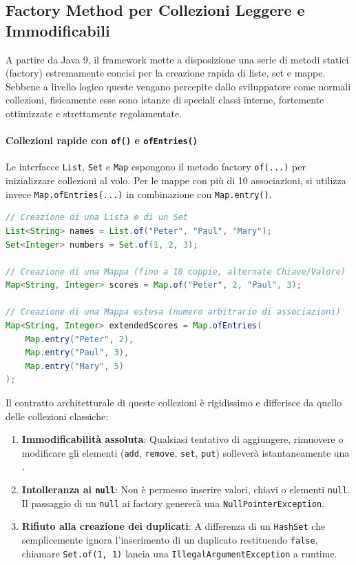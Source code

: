 \subsection{Factory Method per Collezioni Leggere e Immodificabili}

A partire da Java 9, il framework mette a disposizione una serie di metodi statici (factory) estremamente concisi per la creazione rapida di liste, set e mappe. Sebbene a livello logico queste vengano percepite dallo sviluppatore come normali collezioni, fisicamente esse sono istanze di speciali classi interne, fortemente ottimizzate e strettamente regolamentate.

\paragraph{Collezioni rapide con \texttt{of()} e \texttt{ofEntries()}}

Le interfacce \texttt{List}, \texttt{Set} e \texttt{Map} espongono il metodo factory \texttt{of(...)} per inizializzare collezioni al volo. Per le mappe con più di 10 associazioni, si utilizza invece \texttt{Map.ofEntries(...)} in combinazione con \texttt{Map.entry()}.

\begin{lstlisting}[language=Java, caption={Creazione di collezioni tramite factory}]
// Creazione di una Lista e di un Set
List<String> names = List.of("Peter", "Paul", "Mary");
Set<Integer> numbers = Set.of(1, 2, 3);

// Creazione di una Mappa (fino a 10 coppie, alternate Chiave/Valore)
Map<String, Integer> scores = Map.of("Peter", 2, "Paul", 3);

// Creazione di una Mappa estesa (numero arbitrario di associazioni)
Map<String, Integer> extendedScores = Map.ofEntries(
    Map.entry("Peter", 2),
    Map.entry("Paul", 3),
    Map.entry("Mary", 5)
);
\end{lstlisting}

Il contratto architetturale di queste collezioni è rigidissimo e differisce da quello delle collezioni classiche:

\begin{enumerate}
    \item \textbf{Immodificabilità assoluta}: Qualsiasi tentativo di aggiungere, rimuovere o modificare gli elementi (\texttt{add}, \texttt{remove}, \texttt{set}, \texttt{put}) solleverà istantaneamente una .
    \item \textbf{Intolleranza ai \texttt{null}}: Non è permesso inserire valori, chiavi o elementi \texttt{null}. Il passaggio di un \texttt{null} ai factory genererà una \texttt{NullPointerException}.
    \item \textbf{Rifiuto alla creazione dei duplicati}: A differenza di un \texttt{HashSet} che semplicemente ignora l'inserimento di un duplicato restituendo \texttt{false}, chiamare \texttt{Set.of(1, 1)} lancia una \texttt{IllegalArgumentException} a runtime.
\end{enumerate}

